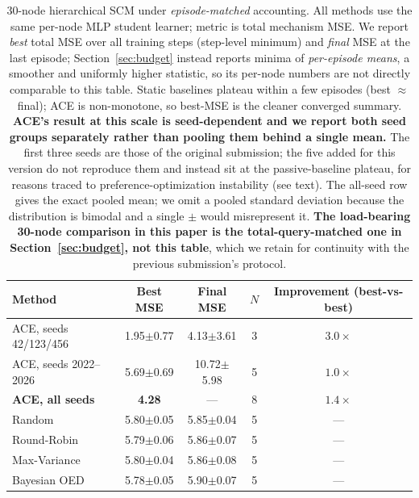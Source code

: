 \documentclass{article}
\theoremstyle{plain}
\theoremstyle{definition}
\theoremstyle{remark}
\begin{document}
\begin{table}[t]
\centering
\caption{30-node hierarchical SCM under \emph{episode-matched} accounting. All methods use the same per-node MLP student learner; metric is total mechanism MSE. We report \emph{best} total MSE over all training steps (step-level minimum) and \emph{final} MSE at the last episode; Section~\ref{sec:budget} instead reports minima of \emph{per-episode means}, a smoother and uniformly higher statistic, so its per-node numbers are not directly comparable to this table. Static baselines plateau within a few episodes (best $\approx$ final); ACE is non-monotone, so best-MSE is the cleaner converged summary. \textbf{ACE's result at this scale is seed-dependent and we report both seed groups separately rather than pooling them behind a single mean.} The first three seeds are those of the original submission; the five added for this version do not reproduce them and instead sit at the passive-baseline plateau, for reasons traced to preference-optimization instability (see text). The all-seed row gives the exact pooled mean; we omit a pooled standard deviation because the distribution is bimodal and a single $\pm$ would misrepresent it. \textbf{The load-bearing 30-node comparison in this paper is the total-query-matched one in Section~\ref{sec:budget}, not this table}, which we retain for continuity with the previous submission's protocol.}
\label{tab:large-scale}
\small
\begin{tabular}{@{}lcccc@{}}
\toprule
Method & Best MSE & Final MSE & $N$ & Improvement (best-vs-best) \\
\midrule
ACE, seeds 42/123/456   & 1.95$\pm$0.77 & 4.13$\pm$3.61 & 3 & $3.0\times$ \\
ACE, seeds 2022--2026   & 5.69$\pm$0.69 & 10.72$\pm$5.98 & 5 & $1.0\times$ \\
\textbf{ACE, all seeds} & \textbf{4.28} & --- & 8 & $1.4\times$ \\
\midrule
Random       & 5.80$\pm$0.05 & 5.85$\pm$0.04 & 5 & --- \\
Round-Robin  & 5.79$\pm$0.06 & 5.86$\pm$0.07 & 5 & --- \\
Max-Variance & 5.80$\pm$0.04 & 5.86$\pm$0.08 & 5 & --- \\
Bayesian OED & 5.78$\pm$0.05 & 5.90$\pm$0.07 & 5 & --- \\
\bottomrule
\end{tabular}
\end{table}
\end{document}
